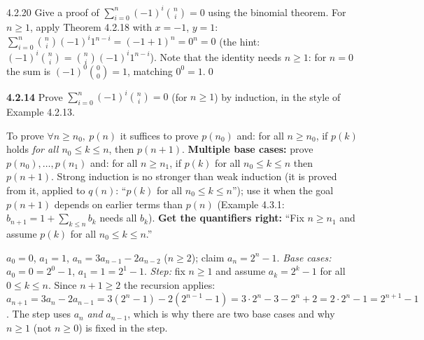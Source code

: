 \begin{bookex}[recommended]{4.2.20}
Give a proof of $\sum_{i=0}^n(-1)^i\binom ni=0$ using the binomial theorem.
\solution
For $n\ge1$, apply Theorem 4.2.18 with $x=-1$, $y=1$: $\sum_{i=0}^n\binom ni(-1)^i1^{n-i}=(-1+1)^n=0^n=0$ (the hint: $(-1)^i\binom ni=\binom ni(-1)^i1^{n-i}$). Note that the identity needs $n\ge1$: for $n=0$ the sum is $(-1)^0\binom00=1$, matching $0^0=1$.\qed
\end{bookex}

\begin{trybox}[{4.2.14 \fO}]
\textbf{4.2.14} Prove $\sum_{i=0}^n(-1)^i\binom ni=0$ (for $n\ge1$) by induction, in the style of Example 4.2.13.
\end{trybox}


\begin{result}
To prove $\forall n\ge n_0,\ p(n)$ it suffices to prove $p(n_0)$ and: for all $n\ge n_0$, if $p(k)$ holds \emph{for all $n_0\le k\le n$}, then $p(n+1)$. \textbf{Multiple base cases:} prove $p(n_0),\dots,p(n_1)$ and: for all $n\ge n_1$, if $p(k)$ for all $n_0\le k\le n$ then $p(n+1)$. Strong induction is no stronger than weak induction (it is proved from it, applied to $q(n)$: ``$p(k)$ for all $n_0\le k\le n$''); use it when the goal $p(n+1)$ depends on earlier terms than $p(n)$ (Example 4.3.1: $b_{n+1}=1+\sum_{k\le n}b_k$ needs all $b_k$). \textbf{Get the quantifiers right:} ``Fix $n\ge n_1$ and assume $p(k)$ for all $n_0\le k\le n$.''
\end{result}
\begin{strategy}
$a_0=0$, $a_1=1$, $a_n=3a_{n-1}-2a_{n-2}$ ($n\ge2$); claim $a_n=2^n-1$. \emph{Base cases:} $a_0=0=2^0-1$, $a_1=1=2^1-1$. \emph{Step:} fix $n\ge1$ and assume $a_k=2^k-1$ for all $0\le k\le n$. Since $n+1\ge2$ the recursion applies: $a_{n+1}=3a_n-2a_{n-1}=3(2^n-1)-2(2^{n-1}-1)=3\cdot2^n-3-2^n+2=2\cdot2^n-1=2^{n+1}-1$. The step uses $a_n$ \emph{and} $a_{n-1}$, which is why there are two base cases and why $n\ge1$ (not $n\ge0$) is fixed in the step.
\end{strategy}

